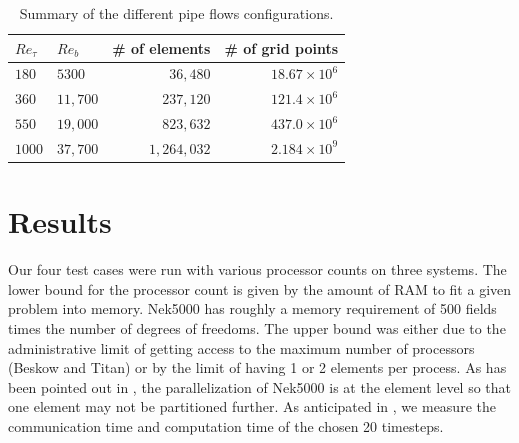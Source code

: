 \documentclass{sig-alternate}
\begin{document}
\begin{table}
\centering
\caption{Summary of the different pipe flows configurations.}
\begin{tabular}{llrr} 
\hline
$Re_{\tau}$&$Re_{b}$&\# of elements & \# of grid points\\ 
\hline
$180$ & $5300$ & $36,480$ & $18.67 \times 10^6$\\
$360$ & $11,700$ & $237,120$ & $121.4 \times 10^6$\\ 
$550$ & $19,000$ & $823,632$ & $437.0 \times 10^6$\\ 
$1000$ & $37,700$ & $1,264,032$ & $2.184 \times 10^9$\\
\hline
\end{tabular}
\label{tab:pipe_conf}
\end{table}


\section{Results}

Our four test cases were run with various processor counts on three systems. The
lower bound for the processor count is given by the amount of RAM to fit a given
problem into memory. Nek5000 has roughly a memory requirement of 500 fields
times the number of degrees of freedoms. The upper bound was either due to the
administrative limit of getting access to the maximum number of processors
(Beskow and Titan) or by the limit of having 1 or 2 elements per process. As has
been pointed out in , the parallelization of Nek5000 is at the
element level so that one element may not be partitioned further. 
As anticipated in , we measure the communication time and
computation time of the chosen 20 timesteps. 
\end{document}
